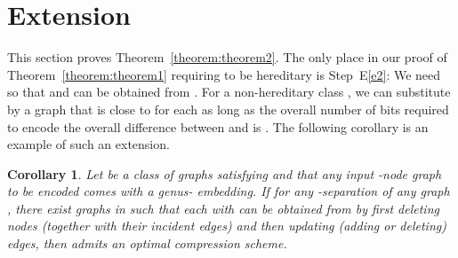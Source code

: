 \documentclass[12pt]{article}
\newtheorem{corollary}{Corollary}[section]
\begin{document}
\section{Extension}
\label{section:extend}

This section proves Theorem~\ref{theorem:theorem2}.  The only place in
our proof of Theorem~\ref{theorem:theorem1} requiring  to be
hereditary is Step~E\ref{e2}: We need  so that
 and  can be
obtained from . For a non-hereditary class
, we can substitute  by a graph  that is close
to  for each  as long as the overall number of
bits required to encode the overall difference between  and
 is . The following corollary is an example of such an
extension.

\begin{corollary}
\label{corollary:corollary1}
Let  be a class of graphs satisfying  and that any input -node graph 
to be encoded comes with a genus- embedding.
If for any -separation  of any graph ,
there exist graphs  in  such that
each  with  can be obtained from  by first
deleting  nodes (together with their incident edges)
and then updating (adding or deleting)  edges,
then  admits an optimal compression scheme.
\end{corollary}
\end{document}
